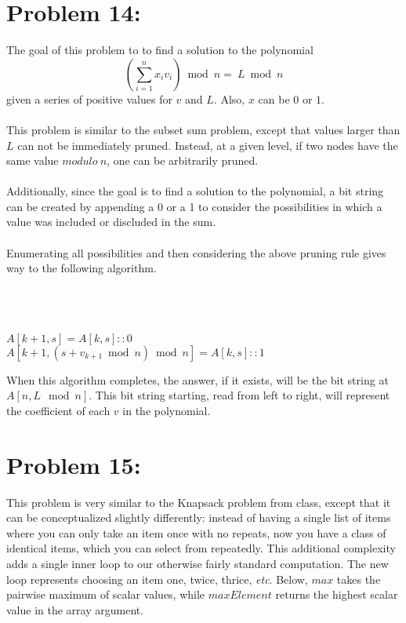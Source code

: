 \documentclass[12pt]{article}
\begin{document}
\section*{Problem 14: }
The goal of this problem to to find a 
solution to the polynomial \[\left(\sum_{i=1}^{n}x_iv_i\right)\bmod n=\ L\bmod n\]
given a series of positive values for $v$ and $L$.  Also, $x$
can be $0$ or $1$.\\\\  
This problem is similar to the subset sum problem, except that
values larger than $L$ can not be immediately pruned.
Instead, at a given level, if two nodes have the same value 
$modulo\ n$, one can be arbitrarily pruned.\\\\
Additionally, since the goal is to find a solution to the
polynomial, a bit string can be created by appending a 0 or a 1
to consider the
possibilities in which a value was included or discluded in
the sum.\\\\
Enumerating all possibilities and then considering the 
above pruning rule gives way to the following algorithm.\\\\
\begin{algorithm}[H]
\\
\\
{
{
{
   $A[k+1,s] = A[k,s]::0$\\
   $A[k+1, (s + v_{k+1}\bmod n)\bmod n] = A[k,s]::1$\\
}
}
}
\end{algorithm}
When this algorithm completes, the answer, if it exists,
will be the bit string at $A[n,L\mod n]$.  This bit string
starting, read from left to right, will represent the 
coefficient of each $v$ in the polynomial.

\section*{Problem 15: }
This problem is very similar to the Knapsack problem from class, except that it can be conceptualized slightly differently: instead of having a single list of items where you can only take an item once with no repeats, now you have a class of identical items, which you can select from repeatedly. This additional complexity adds a single inner loop to our otherwise fairly standard computation. The new loop represents choosing an item one, twice, thrice, \textit{etc}. Below, $max$ takes the pairwise maximum of scalar values, while $maxElement$ returns the highest scalar value in the array argument. 
\end{document}
